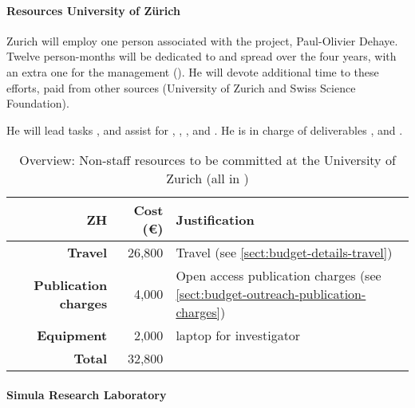 \paragraph{Resources University of Z\"{u}rich}
Zurich will employ one person associated with the project, Paul-Olivier Dehaye. Twelve person-months will be dedicated to  and spread over the four years, with an extra one for the management (). He will devote additional time to these efforts, paid from other sources (University of Zurich and Swiss Science Foundation).

He will lead tasks , and assist for
, ,
,  and
. He is in charge of deliverables ,
and .

\bigskip
\begin{table}[H]
\begin{tabular}{|r|r|p{8.5cm}|}
\hline
\textbf{ZH} & \textbf{Cost (\euro)} & \textbf{Justification} \\\hline
\textbf{Travel} & 26,800 & Travel (see \ref{sect:budget-details-travel})\\\hline
\textbf{Publication charges} & 4,000 & Open access publication charges (see \ref{sect:budget-outreach-publication-charges})\\\hline
\textbf{Equipment} & 2,000 &  laptop for investigator \\\hline    %

\textbf{Total} & 32,800\\\cline{1-2}
\end{tabular}
\caption{Overview: Non-staff resources to be committed at the University of Zurich (all in \texteuro)}\vspace*{-1em}
\end{table}




\paragraph{Simula Research Laboratory}

